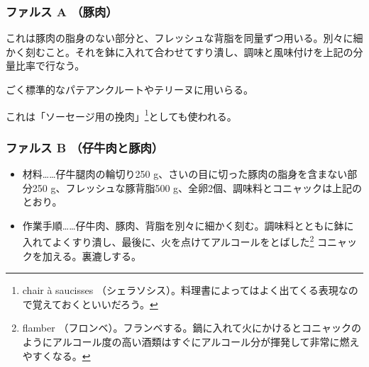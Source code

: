 \begin{recette}
{\subsubsection{ファルス A （豚肉）}\label{farce-froide-a}}



これは豚肉の脂身のない部分と、フレッシュな背脂を同量ずつ用いる。別々に細かく刻むこと。それを鉢に入れて合わせてすり潰し、調味と風味付けを上記の分量比率で行なう。

ごく標準的なパテアンクルートやテリーヌに用いらる。

これは「\protect\hypertarget{chair-a-saucisse}{ソーセージ用の挽肉}」\footnote{chair
  à saucisses
  （シェラソシス）。料理書によってはよく出てくる表現なので覚えておくといいだろう。}としても使われる。\label{chair-a-saucisse}

\hypertarget{farce-froide-b}{%
\subsubsection{ファルス B （仔牛肉と豚肉）}\label{farce-froide-b}}



\begin{itemize}
\item
  材料\ldots{}\ldots{}仔牛腿肉の輪切り250
  g、さいの目に切った豚肉の脂身を含まない部分250
  g、フレッシュな豚背脂500
  g、全卵2個、調味料とコニャックは上記のとおり。
\item
  作業手順\ldots{}\ldots{}仔牛肉、豚肉、背脂を別々に細かく刻む。調味料とともに鉢に入れてよくすり潰し、最後に、火を点けてアルコールをとばした\footnote{flamber
    （フロンベ）。フランベする。鍋に入れて火にかけるとコニャックのようにアルコール度の高い酒類はすぐにアルコール分が揮発して非常に燃えやすくなる。}
  コニャックを加える。裏漉しする。
\end{itemize}


\end{recette}
